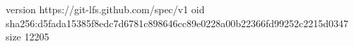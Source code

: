 version https://git-lfs.github.com/spec/v1
oid sha256:d5fada15385f8edc7d6781c898646cc89e0228a00b22366fd99252c2215d0347
size 12205

